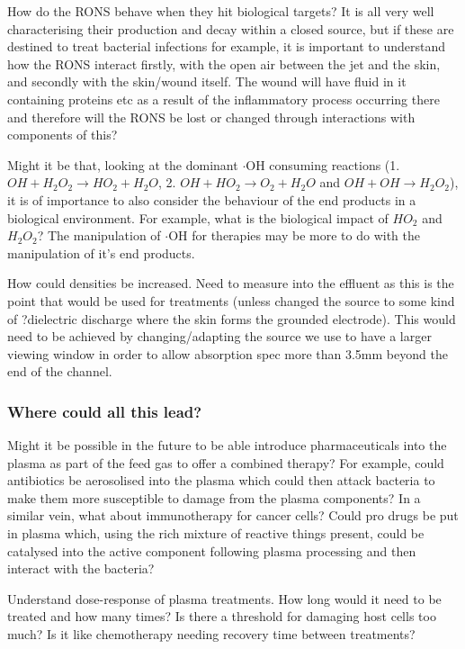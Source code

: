 \documentclass[11pt, oneside]{article}   	%
\begin{document}
How do the RONS behave when they hit biological targets? It is all very well characterising their production and decay within a closed source, but if these are destined to treat bacterial infections for example, it is important to understand how the RONS interact firstly, with the open air between the jet and the skin, and secondly with the skin/wound itself. The wound will have fluid in it containing proteins etc as a result of the inflammatory process occurring there and therefore will the RONS be lost or changed through interactions with components of this?

Might it be that, looking at the dominant $\cdot$OH consuming reactions (1. $ OH + H_2O_2 \rightarrow HO_2 + H_2O$, 2. $OH + HO_2 \rightarrow O_2 + H_2O$ and $OH + OH \rightarrow H_2O_2$), it is of importance to also consider the behaviour of the end products in a biological environment. For example, what is the biological impact of $HO_2$ and $H_2O_2$? The manipulation of $\cdot$OH for therapies may be more to do with the manipulation of it's end products.

How could densities be increased. Need to measure into the effluent as this is the point that would be used for treatments (unless changed the source to some kind of ?dielectric discharge where the skin forms the grounded electrode). This would need to be achieved by changing/adapting the source we use to have a larger viewing window in order to allow absorption spec more than 3.5mm beyond the end of the channel.

\subsubsection{Where could all this lead?}
Might it be possible in the future to be able introduce pharmaceuticals into the plasma as part of the feed gas to offer a combined therapy? For example, could antibiotics be aerosolised into the plasma which could then attack bacteria to make them more susceptible to damage from the plasma components? In a similar vein, what about immunotherapy for cancer cells? Could pro drugs be put in plasma which, using the rich mixture of reactive things present, could be catalysed into the active component following plasma processing and then interact with the bacteria?

Understand dose-response of plasma treatments. How long would it need to be treated and how many times? Is there a threshold for damaging host cells too much? Is it like chemotherapy needing recovery time between treatments? 
\end{document}
